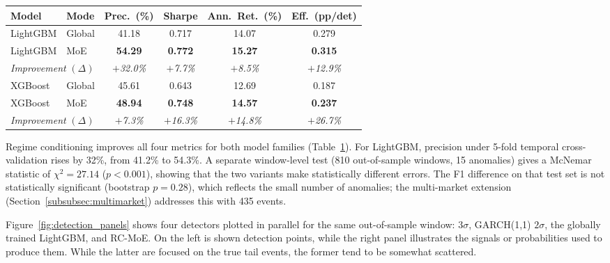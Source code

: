 \documentclass[]{interact}
\begin{document}
\begin{table}[!t]
{\footnotesize
\renewcommand{\arraystretch}{1.25}
\setlength{\tabcolsep}{3pt}
\begin{tabular}{llcccc}
\toprule
\textbf{Model} & \textbf{Mode} & \textbf{Prec.\ (\%)} & \textbf{Sharpe} & \textbf{Ann.\ Ret.\ (\%)} & \textbf{Eff.\ (pp/det)} \\
\midrule
LightGBM & Global       & 41.18 & 0.717 & 14.07 & 0.279 \\
LightGBM & MoE          & \textbf{54.29} & \textbf{0.772} & \textbf{15.27} & \textbf{0.315} \\
\multicolumn{2}{l}{\textit{Improvement} $(\Delta)$} & \textit{$+$32.0\%} & \textit{$+$7.7\%} & \textit{$+$8.5\%}  & \textit{$+$12.9\%} \\
\midrule
XGBoost  & Global       & 45.61 & 0.643 & 12.69 & 0.187 \\
XGBoost  & MoE          & \textbf{48.94} & \textbf{0.748} & \textbf{14.57} & \textbf{0.237} \\
\multicolumn{2}{l}{\textit{Improvement} $(\Delta)$} & \textit{$+$7.3\%}  & \textit{$+$16.3\%} & \textit{$+$14.8\%} & \textit{$+$26.7\%} \\
\bottomrule
\end{tabular}}
\label{tab:regime_conditioning}
\end{table}

Regime conditioning improves all four metrics for both model families (Table~\ref{tab:regime_conditioning}). For LightGBM, precision under 5-fold temporal cross-validation rises by 32\%, from 41.2\% to 54.3\%. A separate window-level test (810 out-of-sample windows, 15 anomalies) gives a McNemar statistic of $\chi^2=27.14$ ($p<0.001$), showing that the two variants make statistically different errors. The F1 difference on that test set is not statistically significant (bootstrap $p=0.28$), which reflects the small number of anomalies; the multi-market extension (Section~\ref{subsubsec:multimarket}) addresses this with 435 events.

Figure~\ref{fig:detection_panels} shows four detectors plotted in parallel for the same out-of-sample window: $3\sigma$, GARCH(1,1) $2\sigma$, the globally trained LightGBM, and RC-MoE. On the left is shown detection points, while the right panel illustrates the signals or probabilities used to produce them. While the latter are focused on the true tail events, the former tend to be somewhat scattered.
\end{document}
